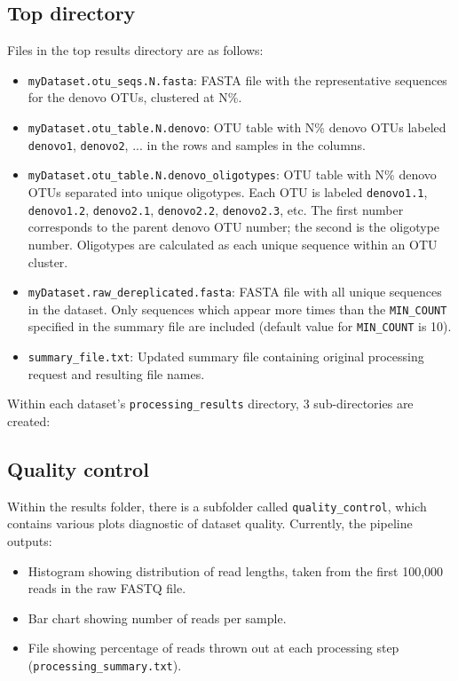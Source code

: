 \documentclass[11pt, oneside]{article}   	%
\begin{document}
\subsection{Top directory}
Files in the top results directory are as follows:
\begin{itemize}
	\item {\tt myDataset.otu\_seqs.N.fasta}: FASTA file with the representative sequences for the denovo OTUs, clustered at N\%.
	\item {\tt myDataset.otu\_table.N.denovo}: OTU table with N\% denovo OTUs labeled {\tt denovo1}, {\tt denovo2}, ... in the rows and samples in the columns.
	\item {\tt myDataset.otu\_table.N.denovo\_oligotypes}: OTU table with N\% denovo OTUs separated into unique oligotypes. Each OTU is labeled {\tt denovo1.1}, {\tt denovo1.2}, {\tt denovo2.1}, {\tt denovo2.2}, {\tt denovo2.3}, etc. The first number corresponds to the parent denovo OTU number; the second is the oligotype number. Oligotypes are calculated as each unique sequence within an OTU cluster.
	\item {\tt myDataset.raw\_dereplicated.fasta}: FASTA file with all unique sequences in the dataset. Only sequences which appear more times than the {\tt MIN\_COUNT} specified in the summary file are included (default value for {\tt MIN\_COUNT} is 10).
	\item {\tt summary\_file.txt}: Updated summary file containing original processing request and resulting file names.
\end{itemize}

Within each dataset's {\tt processing\_results} directory, 3 sub-directories are created:
\subsection{Quality control}
Within the results folder, there is a subfolder called {\tt quality\_control}, which contains various plots diagnostic of dataset quality.  Currently, the pipeline outputs:
\begin{itemize}
	\item Histogram showing distribution of read lengths, taken from the first 100,000 reads in the raw FASTQ file.
	\item Bar chart showing number of reads per sample.
	\item File showing percentage of reads thrown out at each processing step 
	({\tt processing\_summary.txt}).
\end{itemize}
\end{document}
